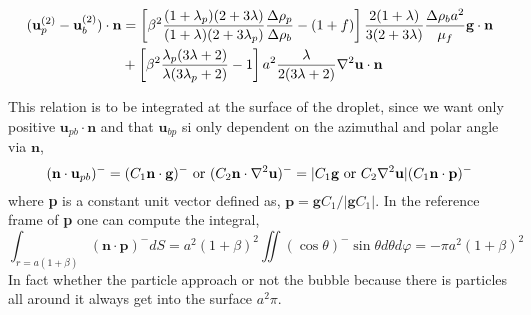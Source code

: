 \documentclass[12pt]{My_preprint}
\begin{document}
\begin{align}
    (\textbf{u}_p^{(2)} - \textbf{u}_b^{(2)})\cdot \textbf{n}
    &=
    \left[\beta^2\frac{(1+\lambda_p)(2+3\lambda)}{(1+\lambda)(2+3\lambda_p)}\frac{\Delta\rho_p}{\Delta\rho_b}  - (1 + f)  \right]  \frac{2(1+\lambda)}{3(2+3\lambda)} \frac{\Delta\rho_b a^2}{\mu_f}\textbf{g}\cdot \textbf{n}\\
    &+ \left[\beta^2\frac{\lambda_p(3\lambda+2)}{\lambda(3\lambda_p +2)} - 1 \right] a^2\frac{\lambda}{2(3\lambda +2)}\mathbf{\nabla}^2 \textbf{u}\cdot \textbf{n}
\end{align}

This relation is to be integrated at the surface of the droplet, since we want only positive $\textbf{u}_{pb}\cdot\textbf{n}$ and that $\textbf{u}_{bp}$ si only dependent on the azimuthal and polar angle via $\textbf{n}$, 
\begin{equation}
    (\textbf{n} \cdot \textbf{u}_{pb})^-
    = 
     (C_1 \textbf{n} \cdot \textbf{g})^-
    \text{ or }
    (C_2 \textbf{n} \cdot \mathbf{\nabla}^2\textbf{u})^-
    =
    |C_1 \textbf{g} \text{ or } C_2 \mathbf{\nabla}^2\textbf{u} |
    (C_1 \textbf{n} \cdot \textbf{p})^-
\end{equation}
where \textbf{p} is a constant unit vector defined as, $\textbf{p} = \textbf{g}C_1 / |\textbf{g} C_1|$. In the reference frame of \textbf{p} one can compute the integral,  
\begin{equation}
    \int_{r=a(1+\beta)} (\textbf{n} \cdot \textbf{p})^-dS
    = a^2(1+\beta)^2
    \iint (\cos \theta)^- \sin\theta d\theta d\varphi
    = - \pi a^2(1+\beta)^2
\end{equation}
In fact whether the particle approach or not the bubble because there is particles all around it always get into the surface $a^2 \pi$. 
\end{document}
